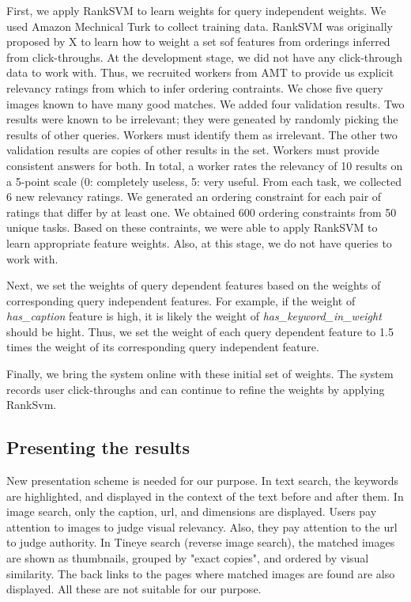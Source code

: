 \documentclass{www2010-submission}
\begin{document}
First, we apply RankSVM to learn weights for query independent
weights.  We used Amazon Mechnical Turk to collect training
data. RankSVM was originally proposed by X to learn how to weight a
set sof features from orderings inferred from click-throughs. At the
development stage, we did not have any click-through data to work
with. Thus, we recruited workers from AMT to provide us explicit
relevancy ratings from which to infer ordering contraints. We chose
five query images known to have many good matches. We added four
validation results.  Two results were known to be irrelevant; they
were geneated by randomly picking the results of other
queries. Workers must identify them as irrelevant. The other two
validation results are copies of other results in the set. Workers
must provide consistent answers for both. In total, a worker rates the
relevancy of 10 results on a 5-point scale (0: completely useless, 5:
very useful. From each task, we collected 6 new relevancy ratings. We
generated an ordering constraint for each pair of ratings that differ
by at least one. We obtained 600 ordering constraints from 50 unique
tasks. Based on these contraints, we were able to apply RankSVM to
learn appropriate feature weights. Also, at this stage, we do not have
queries to work with.

Next, we set the weights of query dependent features based on the
weights of corresponding query independent features. For example, if
the weight of \emph{has_caption} feature is high, it is likely the
weight of \emph{has_keyword_in_weight} should be hight. Thus, we set
the weight of each query dependent feature to 1.5 times the weight of
its corresponding query independent feature.

Finally, we bring the system online with these initial set of
weights. The system records user click-throughs and can continue to
refine the weights by applying RankSvm.

\subsection{Presenting the results}

New presentation scheme is needed for our purpose. In text search,
the keywords are highlighted, and displayed in the context of the
text before and after them. In image search, only the caption,
url, and dimensions are displayed. Users pay attention to images
to judge visual relevancy. Also, they pay attention to the url to
judge authority. In Tineye search (reverse image search), the
matched images are shown as thumbnails, grouped by "exact copies",
and ordered by visual similarity. The back links to the pages
where matched images are found are also displayed. All these are
not suitable for our purpose.
\end{document}

